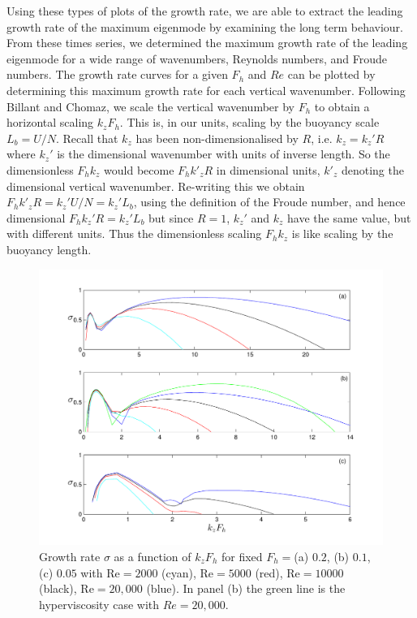 Using these types of plots of the growth rate, we are able to extract the leading growth rate of the maximum eigenmode by examining the long term behaviour. From these times series, we determined the maximum growth rate of the leading eigenmode for a wide range of wavenumbers, Reynolds numbers, and Froude numbers. The growth rate curves for a given $F_{h}$ and $Re$ can be plotted by determining this maximum growth rate for each vertical wavenumber. Following Billant and Chomaz\cite{bc2000c}, we scale the vertical wavenumber by $F_{h}$ to obtain a horizontal scaling $k_{z}F_{h}$.  This is, in our units, scaling by the buoyancy scale $L_{b} = U/N$. Recall that $k_{z}$ has been non-dimensionalised by $R$, i.e. $k_{z}= k_{z}'R$ where $k_{z}'$ is the dimensional wavenumber with units of inverse length. So the dimensionless $F_{h}k_{z}$ would become $F_{h}k'_{z}R$ in dimensional units, $k'_{z}$ denoting the dimensional vertical wavenumber. Re-writing this we obtain $F_{h}k'_{z}R=k_{z}'U/N=k_{z}'L_{b}$, using the definition of the Froude number, and hence dimensional $F_{h}k_{z}'R=k_{z}'L_{b}$ but since $R=1$, $k_{z}'$ and $k_{z}$ have the same value, but with different units. Thus the dimensionless scaling $F_{h}k_{z}$ is like scaling by the buoyancy length. 

\begin{figure}
\begin{center}
\includegraphics[width=\textwidth]{fixed_froude_varying_reynolds}
\caption{Growth rate $\sigma$ as a function of $k_{z}F_{h}$ for fixed $F_{h}=$(a) $0.2$, (b) $0.1$, (c) $0.05$ with Re$=2000$ (cyan), Re$=5000$ (red), Re$=10000$ (black), Re$=20{,}000$ (blue). In panel (b) the green line is the hyperviscosity case with $Re=20{,}000$.}
\label{FixFhVaryRe}
\end{center}
\end{figure}

